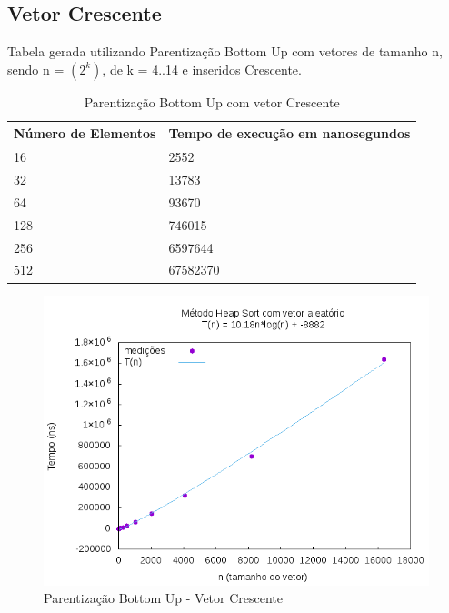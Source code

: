 \documentclass[12pt,a4paper,twoside]{report}
\begin{document}
\subsection{Vetor Crescente}
Tabela gerada utilizando Parentização Bottom Up com vetores de tamanho n, sendo n = $(2^k)$, de k = 4..14 e inseridos Crescente.
\begin{table}[H]
\centering
\caption{Parentização Bottom Up com vetor Crescente}
\label{my-label}
\begin{tabular}{|l|l|}
\hline
\multicolumn{1}{|c|}{\textbf{Número de Elementos}} & \multicolumn{1}{c|}{\textbf{Tempo de execução em nanosegundos}} \\ \hline
16 & 2552 \\ \hline
32 & 13783 \\ \hline
64 & 93670 \\ \hline
128 & 746015 \\ \hline
256 & 6597644 \\ \hline
512 & 67582370 \\ \hline
\end{tabular}
\end{table}

\begin{figure}[H]
    \centering
    \includegraphics[width=0.7\linewidth]{graficos/HeapSort/vIntAleatorio/vIntAleatorio.png}
  \caption{Parentização Bottom Up - Vetor Crescente}
\end{figure}
\end{document}

